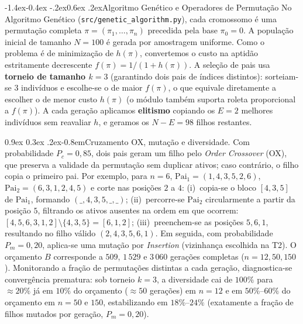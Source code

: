 \documentclass[10pt,a4paper,twocolumn]{article}
\makeatletter
\renewcommand\subsection{\@startsection{subsection}{2}{\z@}%
  {-1.4ex\@plus -0.4ex \@minus -.2ex}{0.6ex \@plus .2ex}{\normalfont\normalsize\bfseries}}
\renewcommand\paragraph{\@startsection{paragraph}{4}{\z@}%
  {0.9ex \@plus 0.3ex \@minus .2ex}{-0.8em}{\normalfont\normalsize\bfseries}}
\makeatother
\begin{document}
\subsection{Algoritmo Genético e Operadores de Permutação}
\label{sec:ga}
No Algoritmo Genético (\texttt{src/genetic\_algorithm.py}), cada cromossomo é uma
permutação completa $\pi=(\pi_1,\dots,\pi_n)$ precedida pela base $\pi_0=0$. A
população inicial de tamanho $N=100$ é gerada por amostragem uniforme. Como o
problema é de minimização de $h(\pi)$, convertemos o custo na aptidão estritamente
decrescente $f(\pi) = 1/(1+h(\pi))$. A seleção de pais usa \textbf{torneio de
tamanho $k=3$} (garantindo dois pais de índices distintos): sorteiam-se 3 indivíduos
e escolhe-se o de maior $f(\pi)$, o que equivale diretamente a escolher o de menor
custo $h(\pi)$ (o módulo também suporta roleta proporcional a $f(\pi)$). A cada
geração aplicamos \textbf{elitismo} copiando os $E=2$ melhores indivíduos sem
reavaliar $h$, e geramos os $N-E=98$ filhos restantes.

\paragraph{Cruzamento OX, mutação e diversidade.}
Com probabilidade $P_c=0{,}85$, dois pais geram um filho pelo \emph{Order Crossover}
(OX), que preserva a validade da permutação sem duplicar ativos; caso contrário, o
filho copia o primeiro pai. Por exemplo, para $n=6$, $\text{Pai}_1=(1,4,3,5,2,6)$,
$\text{Pai}_2=(6,3,1,2,4,5)$ e corte nas posições $2$ a $4$: (i)~copia-se o bloco
$[4,3,5]$ de $\text{Pai}_1$, formando $(\_,4,3,5,\_,\_)$; (ii)~percorre-se
$\text{Pai}_2$ circularmente a partir da posição $5$, filtrando os ativos ausentes na
ordem em que ocorrem: $[4,5,6,3,1,2]\setminus\{4,3,5\}=[6,1,2]$; (iii)~preenchem-se
as posições $5,6,1$, resultando no filho válido $(2,4,3,5,6,1)$. Em seguida, com
probabilidade $P_m=0{,}20$, aplica-se uma mutação por \emph{Insertion} (vizinhança
escolhida na T2). O orçamento $B$ corresponde a $509$, $1\,529$ e $3\,060$ gerações
completas ($n=12,50,150$). Monitorando a fração de permutações distintas a cada
geração, diagnostica-se convergência prematura: sob torneio $k=3$, a diversidade cai
de $100\%$ para $\approx 20\%$ já em $10\%$ do orçamento ($\approx 50$ gerações) em
$n=12$ e em $50\%$--$60\%$ do orçamento em $n=50$ e $150$, estabilizando em
$18\%$--$24\%$ (exatamente a fração de filhos mutados por geração, $P_m=0{,}20$).

\end{document}
